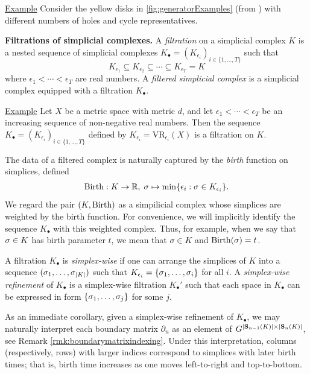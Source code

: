 \noindent \underline{Example} Consider the yellow disks in \fig \ref{fig:generatorExamples} (from  \cite{Carlsson2009TopologyAD}) with different numbers of holes and cycle representatives. 


 

\noindent \textbf{Filtrations of simplicial complexes.} A \emph{filtration} on a simplicial complex $K$ is a nested sequence of  simplicial complexes $K_\bullet = (K_{\epsilon_i})_{i \in\{ 1, \ldots, T\}}$ such that
    $$
    K_{\epsilon_1} \subseteq K_{\epsilon_2} \subseteq \cdots \subseteq K_{\epsilon_T} = K
    $$
where $\epsilon_1 < \cdots < \epsilon_T$ are real numbers. A \emph{filtered simplicial complex} is a simplicial complex equipped with a filtration $K_\bullet$.

\noindent \underline{Example}
 Let  $X$ be a metric space with metric $d$, and let  $\epsilon_1 < \cdots < \epsilon_T$ be an increasing sequence of non-negative real numbers.  Then the sequence $K_\bullet = (K_{\epsilon_i})_{i \in\{ 1, \ldots, T\}}$ defined by $K_{\epsilon_i} = \text{VR}_{\epsilon_i}(X)$ is a filtration on $K$.

The data of a filtered complex is naturally captured by the \emph{birth} function on simplices, defined
    \begin{align*}
        \mathrm{Birth}: K \to \mathbb{R}, \; \sigma \mapsto \min\{ \epsilon_i : \sigma \in K_{\epsilon_i} \}.
    \end{align*}
We regard the pair $(K, \mathrm{Birth})$ as a simpilicial complex whose simplices are weighted by the birth function.   For convenience, we will implicitly identify the sequence $K_\bullet$ with this weighted complex.   Thus, for example, when we say that $\sigma \in K$ has birth parameter $t$, we mean that  $\sigma\in K$ and  $\mathrm{Birth}(\sigma) = t$.


\begin{definition}
A filtration $K_\bullet$ is \emph{simplex-wise} if one can arrange the simplices of $K$ into a sequence $(\sigma_1, \ldots, \sigma_{|K|})$ such that $K_{\epsilon_i} = \{\sigma_1, \ldots, \sigma_i\}$ for all $i$.  
A \emph{simplex-wise refinement}  of $K_\bullet$ is a simplex-wise filtration $K_\bullet'$ such that each space in $K_\bullet$ can be expressed in form $\{\sigma_1, \ldots, \sigma_j\}$ for some $j$.
\end{definition}
 

As an immediate corollary, given a simplex-wise refinement of $K_\bullet$, we may naturally interpret each boundary matrix $\partial_n$ as an element of $G^{|\mathbf{S}_{n-1}(K)| \times |\mathbf{S}_{n}(K)|}$, see Remark \ref{rmk:boundarymatrixindexing}.  Under this interpretation, columns (respectively, rows) with larger indices correspond to simplices with later birth times; that is, birth time increases as one moves left-to-right and top-to-bottom.  



